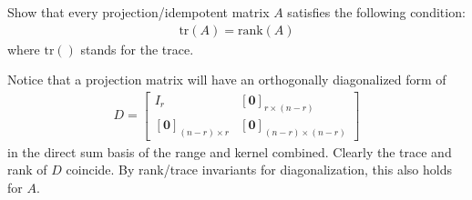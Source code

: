 \begin{Exercise}
Show that every projection/idempotent matrix $A$ satisfies the following condition:
\begin{align*}
\text{tr}(A) = \text{rank}(A)
\end{align*}
where $\text{tr}()$ stands for the trace.
\end{Exercise}
\begin{Answer}
Notice that a projection matrix will have an orthogonally diagonalized form of
\begin{align*}
D = 
\begin{bmatrix}
I_r & [\textbf{0}]_{r\times(n-r)} \\
[\textbf{0}]_{(n-r)\times r} & [\textbf{0}]_{(n-r)\times(n-r)}
\end{bmatrix}
\end{align*}
in the direct sum basis of the range and kernel combined. Clearly the trace and rank of $D$ coincide. By rank/trace invariants for diagonalization, this also holds for $A$.
\end{Answer}

